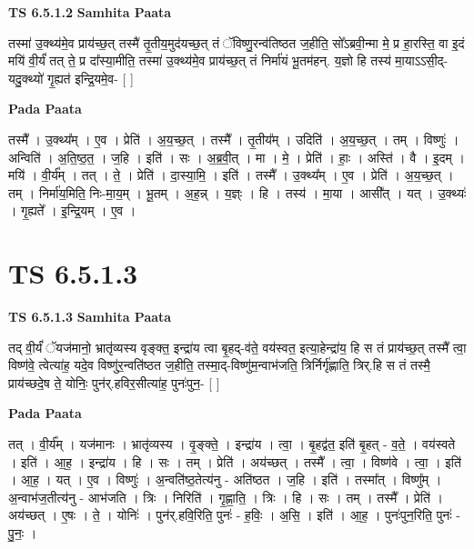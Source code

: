 \documentclass[17pt]{extarticle}
\begin{document}
\textbf{TS 6.5.1.2 } \newline
\textbf{Samhita Paata} \newline

तस्मा॑ उ॒क्थ्य॑मे॒व प्राय॑च्छ॒त् तस्मै॑ तृ॒तीय॒मुद॑यच्छ॒त् तं ॅविष्णु॒रन्व॑तिष्ठत ज॒हीति॒ सो᳚ऽब्रवी॒न्मा मे॒ प्र हा॒रस्ति॒ वा इ॒दं मयि॑ वी॒र्यं॑ तत् ते॒ प्र दा᳚स्या॒मीति॒ तस्मा॑ उ॒क्थ्य॑मे॒व प्राय॑च्छ॒त् तं निर्मा॑यं भू॒तम॑हन्. य॒ज्ञो हि तस्य॑ मा॒याऽऽसी॒द्-यदु॒क्थ्यो॑ गृ॒ह्यत॑ इन्द्रि॒यमे॒व- [  ] \newline

\textbf{Pada Paata} \newline

तस्मै᳚ । उ॒क्थ्य᳚म् । ए॒व । प्रेति॑ । अ॒य॒च्छ॒त् । तस्मै᳚ । तृ॒तीय᳚म् । उदिति॑ । अ॒य॒च्छ॒त् । तम् । विष्णुः॑ । अन्विति॑ । अ॒ति॒ष्ठ॒त॒ । ज॒हि । इति॑ । सः । अ॒ब्र॒वी॒त् । मा । मे॒ । प्रेति॑ । हाः॒ । अस्ति॑ । वै । इ॒दम् । मयि॑ । वी॒र्य᳚म् । तत् । ते॒ । प्रेति॑ । दा॒स्या॒मि॒ । इति॑ । तस्मै᳚ । उ॒क्थ्य᳚म् । ए॒व । प्रेति॑ । अ॒य॒च्छ॒त् । तम् । निर्मा॑य॒मिति॒ निः-मा॒य॒म् । भू॒तम् । अ॒ह॒न्न् । य॒ज्ञ्ः । हि । तस्य॑ । मा॒या । आसी᳚त् । यत् । उ॒क्थ्यः॑ । गृ॒ह्यते᳚ । इ॒न्द्रि॒यम् । ए॒व ।  \newline




\section*{ TS 6.5.1.3 }

\textbf{TS 6.5.1.3 } \newline
\textbf{Samhita Paata} \newline

तद् वी॒र्यं॑ ॅयज॑मानो॒ भ्रातृ॑व्यस्य वृङ्क्त॒ इन्द्रा॑य त्वा बृ॒हद्-व॑ते॒ वय॑स्वत॒ इत्या॒हेन्द्रा॑य॒ हि स तं प्राय॑च्छ॒त् तस्मै᳚ त्वा॒ विष्ण॑वे॒ त्वेत्या॑ह॒ यदे॒व विष्णु॑र॒न्वति॑ष्ठत ज॒हीति॒ तस्मा॒द्-विष्णु॑म॒न्वाभ॑जति॒ त्रिर्निर्गृ॑ह्णाति॒ त्रिर्.हि स तं तस्मै॒ प्राय॑च्छदे॒ष ते॒ योनिः॒ पुन॑र्.हविर॒सीत्या॑ह॒ पुनः॑पुन॒- [  ] \newline

\textbf{Pada Paata} \newline

तत् । वी॒र्य᳚म् । यज॑मानः । भ्रातृ॑व्यस्य । वृ॒ङ्क्ते॒ । इन्द्रा॑य । त्वा॒ । बृ॒हद्व॑त॒ इति॑ बृ॒हत् - व॒ते॒ । वय॑स्वते । इति॑ । आ॒ह॒ । इन्द्रा॑य । हि । सः । तम् । प्रेति॑ । अय॑च्छत् । तस्मै᳚ । त्वा॒ । विष्ण॑वे । त्वा॒ । इति॑ । आ॒ह॒ । यत् । ए॒व । विष्णुः॑ । अ॒न्वति॑ष्ठ॒तेत्य॑नु - अति॑ष्ठत । ज॒हि । इति॑ । तस्मा᳚त् । विष्णु᳚म् । अ॒न्वाभ॑ज॒तीत्य॑नु - आभ॑जति । त्रिः । निरिति॑ । गृ॒ह्णा॒ति॒ । त्रिः । हि । सः । तम् । तस्मै᳚ । प्रेति॑ । अय॑च्छत् । ए॒षः । ते॒ । योनिः॑ । पुन॑र्.हवि॒रिति॒ पुनः॑ - ह॒विः॒ । अ॒सि॒ । इति॑ । आ॒ह॒ । पुनः॑पुन॒रिति॒ पुनः॑ - पु॒नः॒ ।  \newline
\end{document}
